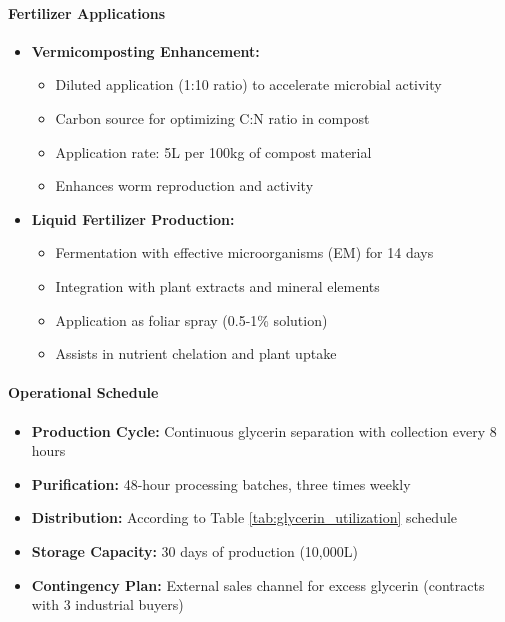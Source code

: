 \paragraph{Fertilizer Applications}
\label{sec:glycerin_as_fertilizer}
\begin{itemize}
    \item \textbf{Vermicomposting Enhancement:}
    \begin{itemize}
        \item Diluted application (1:10 ratio) to accelerate microbial activity
        \item Carbon source for optimizing C:N ratio in compost
        \item Application rate: 5L per 100kg of compost material
        \item Enhances worm reproduction and activity
    \end{itemize}
    
    \item \textbf{Liquid Fertilizer Production:}
    \begin{itemize}
        \item Fermentation with effective microorganisms (EM) for 14 days
        \item Integration with plant extracts and mineral elements
        \item Application as foliar spray (0.5-1\% solution)
        \item Assists in nutrient chelation and plant uptake
    \end{itemize}
\end{itemize}

\paragraph{Operational Schedule}
\begin{itemize}
    \item \textbf{Production Cycle:} Continuous glycerin separation with collection every 8 hours
    \item \textbf{Purification:} 48-hour processing batches, three times weekly
    \item \textbf{Distribution:} According to Table \ref{tab:glycerin_utilization} schedule
    \item \textbf{Storage Capacity:} 30 days of production (10,000L)
    \item \textbf{Contingency Plan:} External sales channel for excess glycerin (contracts with 3 industrial buyers)
\end{itemize}

